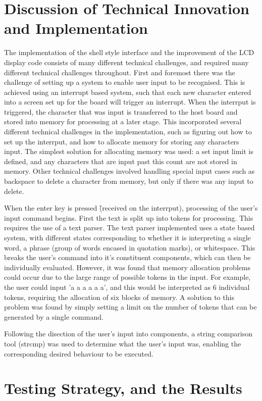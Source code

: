 \section{Discussion of Technical Innovation and Implementation}

The implementation of the shell style interface and the improvement of the LCD 
display code consists of many different technical challenges, and required many 
different technical challenges throughout. First and foremost there was the 
challenge of setting up a system to enable user input to be recognised. This is 
achieved using an interrupt based system, such that each new character entered into 
a screen set up for the board will trigger an interrupt. When the interrput is 
triggered, the character that was input is transferred to the host board and stored into 
memory for processing at a later stage. This incorporated several different technical 
challenges in the implementation, such as figuring out how to set up the interrput, and 
how to allocate memory for storing any characters input. The simplest solution for 
allocating memory was used: a set input limit is defined, and any characters that are 
input past this count are not stored in memory. Other technical challenges involved handling 
special input cases such as backspace to delete a character from memory, but only if there 
was any input to delete. 

When the enter key is pressed (\r\n received on the interrput), processing of the user's 
input command begins. 
First the text is split up into tokens for processing. This 
requires the use of a text parser. The text parser implemented uses a state based system,
with different states corresponding to whether it is interpreting a single word, a phrase 
(group of words encased in quotation marks), or whitespace. This breaks the user's 
command into it's constituent components, which can then be individually evaluated. 
However, it was found that memory allocation problems could occur due to the large range of 
possible tokens in the input. For example, the user could input 'a a a a a a', and this 
would be interpreted as 6 individual tokens, requiring the allocation of six blocks of 
memory. A solution to this problem was found by simply setting a limit on the number 
of tokens that can be generated by a single command. 

Following the disection of the user's input into components, a string comparison tool (strcmp)
was used to determine what the user's input was, enabling the corresponding desired 
behaviour to be executed. 


\section{Testing Strategy, and the Results}
